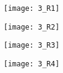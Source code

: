 \begin{QCM}
\begin{GroupeQCM}
\begin{exercice}
\begin{ChoixQCM}{4}
      \texttt{[image: 3\_R1]}
      \item 
      
      \texttt{[image: 3\_R2]}
      \item 
      
      \texttt{[image: 3\_R3]}
      \item 
      
      \texttt{[image: 3\_R4]}
      \end{ChoixQCM}
\begin{corrige}
   \end{corrige}
    \end{exercice}
    
    
    \end{GroupeQCM}
\end{QCM}
    
\vfill
\newpage

    
    
